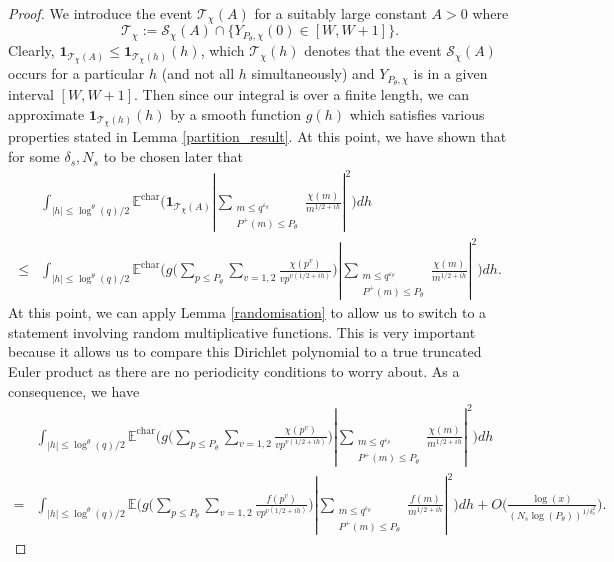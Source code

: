 \documentclass[10pt,a4paper]{amsart}
\numberwithin{equation}{section}
\begin{document}
    \begin{proof}
    We introduce the event $\mathcal{T}_\chi(A)$ for a suitably large constant $A>0$ where
    $$\mathcal{T}_\chi := \mathcal{S}_{\chi}(A) \cap \{Y_{P_\theta,\chi}(0) \in [W,W+1]\}.$$
    Clearly, $\mathbf{1}_{\mathcal{T}_\chi(A)} \leq \mathbf{1}_{\mathcal{T}_\chi(h)}(h)$, which $\mathcal{T}_\chi(h)$ denotes that the event $\mathcal{S}_\chi(A)$ occurs for a particular $h$ (and not all $h$ simultaneously) and $Y_{P_\theta,\chi}$ is in a given interval $[W,W+1]$. Then since our integral is over a finite length, we can approximate $\mathbf{1}_{\mathcal{T}_\chi(h)}(h)$ by a smooth function $g(h)$ which satisfies various properties stated in Lemma \ref{partition_result}. At this point, we have shown that for some $\delta_s,N_s$ to be chosen later that
    \begin{align*}
        &\int_{|h| \leq \log^{\theta}(q)/2}\mathbb{E}^{\text{char}}\big(\mathbf{1}_{\mathcal{T}_\chi(A)}|\sum_{\substack{m \leq q^{\varepsilon_\theta} \\ P^+(m) \leq P_\theta}}\frac{\chi(m)}{m^{1/2+ih}}|^2\big)dh \\ \leq& \int_{|h| \leq \log^{\theta}(q)/2}\mathbb{E}^{\text{char}}\big(g\big(\sum_{p \leq P_\theta}\sum_{v=1,2}\frac{\chi(p^v)}{vp^{v(1/2+ih)}}\big)|\sum_{\substack{m \leq q^{\varepsilon_\theta} \\ P^+(m) \leq P_\theta}}\frac{\chi(m)}{m^{1/2+ih}}|^2\big)dh.
    \end{align*}
    At this point, we can apply Lemma \ref{randomisation} to allow us to switch to a statement involving random multiplicative functions. This is very important because it allows us to compare this Dirichlet polynomial to a true truncated Euler product as there are no periodicity conditions to worry about. As a consequence, we have
    \begin{align*}
        &\int_{|h| \leq \log^{\theta}(q)/2}\mathbb{E}^{\text{char}}\big(g\big(\sum_{p \leq P_\theta}\sum_{v=1,2}\frac{\chi(p^v)}{vp^{v(1/2+ih)}}\big)|\sum_{\substack{m \leq q^{\varepsilon_\theta} \\ P^+(m) \leq P_\theta}}\frac{\chi(m)}{m^{1/2+ih}}|^2\big)dh \\=&\int_{|h| \leq \log^{\theta}(q)/2}\mathbb{E}\big(g\big(\sum_{p \leq P_\theta}\sum_{v=1,2}\frac{f(p^v)}{vp^{v(1/2+ih)}}\big)|\sum_{\substack{m \leq q^{\varepsilon_\theta} \\ P^+(m) \leq P_\theta}}\frac{f(m)}{m^{1/2+ih}}|^2\big)dh + O\big(\frac{\log(x)}{(N_s\log(P_\theta))^{1/\delta_s^2}}\big).
    \end{align*}

\end{proof}
\end{document}
